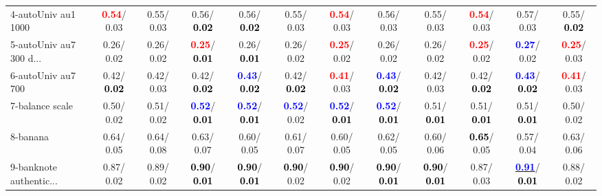 \begin{table}[h]
\begin{center}
{\begin{tabular}{lc|c|c|c|c|c|c|c|c|c|c}
4-autoUniv au1 1000 & \textcolor{red}{\textbf{  0.54}}/  0.03 &   0.55/  0.03 &   0.56/\textcolor{black}{\textbf{  0.02}} &   0.56/\textcolor{black}{\textbf{  0.02}} &   0.55/  0.03 & \textcolor{red}{\textbf{  0.54}}/  0.03 &   0.56/  0.03 &   0.55/  0.03 & \textcolor{red}{\textbf{  0.54}}/  0.03 &   0.57/  0.03 &   0.55/\textcolor{black}{\textbf{  0.02}} \\
5-autoUniv au7 300 d... &   0.26/  0.02 &   0.26/  0.02 & \textcolor{red}{\textbf{  0.25}}/\textcolor{black}{\textbf{  0.01}} &   0.26/\textcolor{black}{\textbf{  0.01}} &   0.26/  0.02 & \textcolor{red}{\textbf{  0.25}}/  0.02 &   0.26/  0.02 &   0.26/  0.02 & \textcolor{red}{\textbf{  0.25}}/  0.02 & \textcolor{blue}{\textbf{  0.27}}/  0.02 & \textcolor{red}{\textbf{  0.25}}/  0.03 \\
6-autoUniv au7 700 &   0.42/\textcolor{black}{\textbf{  0.02}} &   0.42/  0.03 &   0.42/\textcolor{black}{\textbf{  0.02}} & \textcolor{blue}{\textbf{  0.43}}/\textcolor{black}{\textbf{  0.02}} &   0.42/\textcolor{black}{\textbf{  0.02}} & \textcolor{red}{\textbf{  0.41}}/  0.03 & \textcolor{blue}{\textbf{  0.43}}/\textcolor{black}{\textbf{  0.02}} &   0.42/  0.03 &   0.42/\textcolor{black}{\textbf{  0.02}} & \textcolor{blue}{\textbf{  0.43}}/\textcolor{black}{\textbf{  0.02}} & \textcolor{red}{\textbf{  0.41}}/  0.03 \\
7-balance scale &   0.50/  0.02 &   0.51/  0.02 & \textcolor{blue}{\textbf{  0.52}}/\textcolor{black}{\textbf{  0.01}} & \textcolor{blue}{\textbf{  0.52}}/\textcolor{black}{\textbf{  0.01}} & \textcolor{blue}{\textbf{  0.52}}/  0.02 & \textcolor{blue}{\textbf{  0.52}}/\textcolor{black}{\textbf{  0.01}} & \textcolor{blue}{\textbf{  0.52}}/\textcolor{black}{\textbf{  0.01}} &   0.51/\textcolor{black}{\textbf{  0.01}} &   0.51/\textcolor{black}{\textbf{  0.01}} &   0.51/\textcolor{black}{\textbf{  0.01}} &   0.50/  0.02 \\ \hline
8-banana &   0.64/  0.05 &   0.64/  0.08 &   0.63/  0.07 &   0.60/  0.05 &   0.61/  0.07 &   0.60/  0.05 &   0.62/  0.05 &   0.60/  0.06 & \textcolor{black}{\textbf{  0.65}}/  0.05 &   0.57/  0.04 &   0.63/  0.06 \\
9-banknote authentic... &   0.87/  0.02 &   0.89/  0.02 & \textcolor{black}{\textbf{  0.90}}/\textcolor{black}{\textbf{  0.01}} & \textcolor{black}{\textbf{  0.90}}/\textcolor{black}{\textbf{  0.01}} & \textcolor{black}{\textbf{  0.90}}/  0.02 & \textcolor{black}{\textbf{  0.90}}/  0.02 & \textcolor{black}{\textbf{  0.90}}/\textcolor{black}{\textbf{  0.01}} & \textcolor{black}{\textbf{  0.90}}/\textcolor{black}{\textbf{  0.01}} &   0.87/  0.03 & \underline{\textcolor{blue}{\textbf{  0.91}}}/\textcolor{black}{\textbf{  0.01}} &   0.88/  0.02 \\

\end{tabular}}
\end{center}
\end{table}

